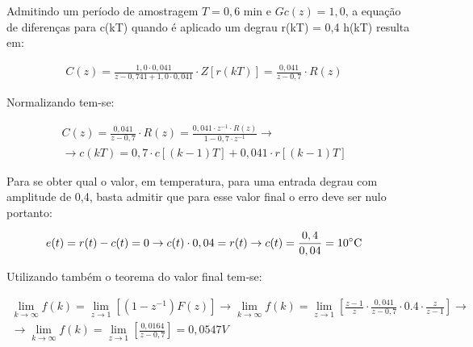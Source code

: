 \documentclass[a4paper,12pt]{article}
\begin{document}
			Admitindo um período de amostragem $T = 0,6$ min e $Gc(z) = 1,0$, a equação de diferenças para c(kT) quando é aplicado um degrau r(kT) = 0,4 h(kT) resulta em:
			
			\begin{equation}
				\left.
				\begin{array}{c}
					\displaystyle C(z) = \frac{1,0 \cdot 0,041}{z - 0,741 + 1,0 \cdot 0,041} \cdot Z\left[r(kT)\right] = \frac{0,041}{z - 0,7} \cdot R(z)
				\end{array}
				\right.
				\quad 
			\end{equation}
			
			Normalizando tem-se:
			
			\begin{equation}
				\left.
				\begin{array}{c}
					\displaystyle C(z) = \frac{0,041}{z - 0,7} \cdot R(z) = \frac{0,041 \cdot z^{-1} \cdot R(z)}{1 - 0,7 \cdot z^{-1}}  \rightarrow \\[20pt]
					\rightarrow \displaystyle c(kT) = 0,7\cdot c[(k-1)T] + 0,041 \cdot r[(k-1)T]
				\end{array}
				\right.
				\quad 
			\end{equation}
			
			Para se obter qual o valor, em temperatura, para uma entrada degrau com amplitude de 0,4, basta admitir que para esse valor final o erro deve ser nulo portanto:
			
			\begin{equation}
				\left.
				\begin{array}{c}
					\displaystyle e(t)= r(t) - c(t) = 0 \rightarrow c(t) \cdot 0,04 = r(t) \rightarrow c(t) = \frac{0,4}{0,04} = 10 \celsius
				\end{array}
				\right.
				\quad 
			\end{equation}
			
			Utilizando também o teorema do valor final tem-se:
			
			\begin{equation}
				\left.
				\begin{array}{c}
					\displaystyle \lim_{k \to \infty}f(k) = \lim_{z \to 1}\left[(1-z^{-1})F(z) \right] \rightarrow \lim_{k \to \infty}f(k) = \lim_{z \to 1}\left[ \frac{z-1}{z} \cdot \frac{0,041}{z - 0,7} \cdot 0.4 \cdot \frac{z}{z-1}  \right] \rightarrow \\[20pt]
					
					\displaystyle \rightarrow \lim_{k \to \infty}f(k) =  \lim_{z \to 1}\left[  \frac{0,0164}{z - 0,7}  \right] = 0,0547 V
				\end{array}
				\right.
				\quad 
			\end{equation}
			
\end{document}
